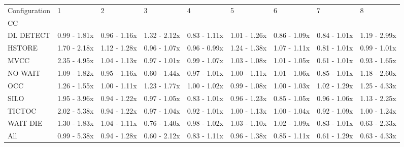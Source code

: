 \begin{tabular}{lllllllll}
\toprule
Configuration &             1 &             2 &             3 &             4 &             5 &             6 &             7 &             8 \\
CC        &               &               &               &               &               &               &               &               \\
\midrule
DL DETECT &  0.99 - 1.81x &  0.96 - 1.16x &  1.32 - 2.12x &  0.83 - 1.11x &  1.01 - 1.26x &  0.86 - 1.09x &  0.84 - 1.01x &  1.19 - 2.99x \\
HSTORE    &  1.70 - 2.18x &  1.12 - 1.28x &  0.96 - 1.07x &  0.96 - 0.99x &  1.24 - 1.38x &  1.07 - 1.11x &  0.81 - 1.01x &  0.99 - 1.01x \\
MVCC      &  2.35 - 4.95x &  1.04 - 1.13x &  0.97 - 1.01x &  0.99 - 1.07x &  1.03 - 1.08x &  1.01 - 1.05x &  0.61 - 1.01x &  0.93 - 1.65x \\
NO WAIT   &  1.09 - 1.82x &  0.95 - 1.16x &  0.60 - 1.44x &  0.97 - 1.01x &  1.00 - 1.11x &  1.01 - 1.06x &  0.85 - 1.01x &  1.18 - 2.60x \\
OCC       &  1.26 - 1.55x &  1.00 - 1.11x &  1.23 - 1.77x &  1.00 - 1.02x &  0.99 - 1.08x &  1.00 - 1.03x &  1.02 - 1.29x &  1.25 - 4.33x \\
SILO      &  1.95 - 3.96x &  0.94 - 1.22x &  0.97 - 1.05x &  0.83 - 1.01x &  0.96 - 1.23x &  0.85 - 1.05x &  0.96 - 1.06x &  1.13 - 2.25x \\
TICTOC    &  2.02 - 5.38x &  0.94 - 1.22x &  0.97 - 1.04x &  0.92 - 1.01x &  1.00 - 1.13x &  1.00 - 1.04x &  0.92 - 1.09x &  1.00 - 1.24x \\
WAIT DIE  &  1.30 - 1.83x &  1.04 - 1.11x &  0.76 - 1.40x &  0.98 - 1.02x &  1.03 - 1.10x &  1.02 - 1.09x &  0.83 - 1.01x &  0.63 - 2.33x \\
All       &  0.99 - 5.38x &  0.94 - 1.28x &  0.60 - 2.12x &  0.83 - 1.11x &  0.96 - 1.38x &  0.85 - 1.11x &  0.61 - 1.29x &  0.63 - 4.33x \\
\bottomrule
\end{tabular}
